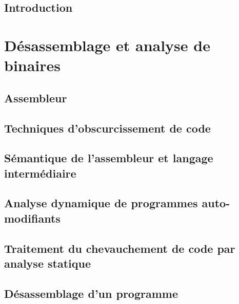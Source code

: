 \DontFrameThisInToc
\chapter*{Introduction\label{chap:introduction}}


\part{Désassemblage et analyse de binaires}

\DontFrameThisInToc
\chapter{\prefchap Assembleur\label{chap:assembleur}}


\DontFrameThisInToc
\chapter{\prefchap Techniques d'obscurcissement de code\label{chap:obscurcissement}}


\DontFrameThisInToc
\chapter{\prefchap Sémantique de l'assembleur et langage intermédiaire\label{chap:semantique}}


\DontFrameThisInToc
\chapter{\prefchap Analyse dynamique de programmes auto-modifiants\label{chap:auto-modification}}


\DontFrameThisInToc
\chapter{\prefchap Traitement du chevauchement de code par analyse statique\label{chap:chevauchement}}


\DontFrameThisInToc
\chapter{\prefchap Désassemblage d'un programme \sm\label{chap:desassembleur}}


